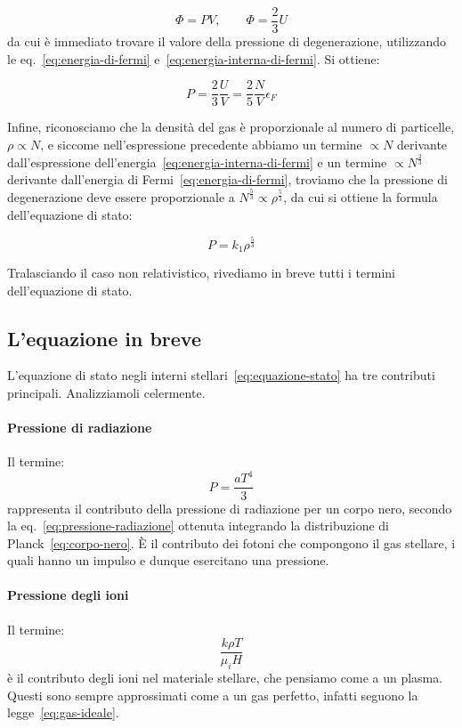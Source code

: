  \[
    \Phi = PV, \qquad \Phi = \frac{2}{3} U
 \]
da cui è immediato trovare il valore della pressione di degenerazione, utilizzando le eq.~\eqref{eq:energia-di-fermi} e~\eqref{eq:energia-interna-di-fermi}. Si ottiene:

\begin{equation}\label{eq:pressione-degenerazione-kennett}
    P = \frac{2}{3} \frac{U}{V} = \frac{2}{5} \frac{N}{V} \epsilon_F
\end{equation}

Infine, riconosciamo che la densità del gas è proporzionale al numero di particelle, $\rho \propto N$, e siccome nell'espressione precedente abbiamo un termine $\propto N$ derivante dall'espressione dell'energia~\eqref{eq:energia-interna-di-fermi} e un termine $\propto N^\frac{2}{3}$ derivante dall'energia di Fermi~\eqref{eq:energia-di-fermi}, troviamo che la pressione di degenerazione deve essere proporzionale a $N^\frac{5}{3} \propto \rho^\frac{5}{3}$, da cui si ottiene la formula dell'equazione di stato:

\[
  P = k_1 \rho^\frac{5}{3}  
\]

Tralasciando il caso non relativistico, rivediamo in breve tutti i termini dell'equazione di stato.

\subsection{L'equazione in breve}
L'equazione di stato negli interni stellari~\eqref{eq:equazione-stato} ha tre contributi principali. Analizziamoli celermente.

\paragraph{Pressione di radiazione}
Il termine:
\[
P = \dfrac{aT^4}{3}
\]
rappresenta il contributo della pressione di radiazione per un corpo nero, secondo la eq.~\eqref{eq:pressione-radiazione} ottenuta integrando la distribuzione di Planck~\ref{eq:corpo-nero}. È il contributo dei fotoni che compongono il gas stellare, i quali hanno un impulso e dunque esercitano una pressione.

\paragraph{Pressione degli ioni}
Il termine:
\[
\dfrac{k \rho T}{\mu_i H}
\]
è il contributo degli ioni nel materiale stellare, che pensiamo come a un plasma. Questi sono sempre approssimati come a un gas perfetto, infatti seguono la legge~\eqref{eq:gas-ideale}.

